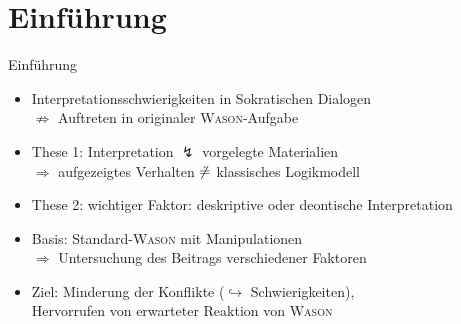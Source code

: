 
{
    \section{Einführung}
}

\begin{frame}{Einführung {\scriptsize \cite[S.~93-95]{stenningHumanReasoningCognitive2008}}}
    \begin{itemize}
        \item Interpretationsschwierigkeiten in Sokratischen Dialogen \\
            $\not \Rightarrow$ Auftreten in originaler \textsc{Wason}-Aufgabe

        \item These 1: Interpretation $\lightning$ vorgelegte Materialien \\
            $\Rightarrow$ aufgezeigtes Verhalten $\centernot {\hat=}$ klassisches Logikmodell

        \item These 2: wichtiger Faktor: deskriptive oder deontische Interpretation

        \item Basis: Standard-\textsc{Wason} mit \alert{Manipulationen} \\
            $\Rightarrow$ Untersuchung des Beitrags verschiedener Faktoren
        
        \item Ziel: Minderung der Konflikte ($\hookrightarrow$ Schwierigkeiten), \\
            Hervorrufen von erwarteter Reaktion von \textsc{Wason}
    \end{itemize}
\end{frame}
